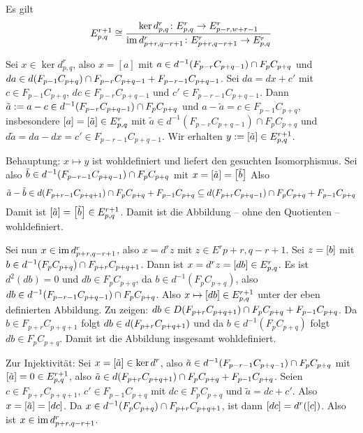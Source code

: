 \begin{lemma}
	Es gilt
	\[
		E^{r+1}_{p,q} \cong \frac{\ker d^r_{p,q} \colon E^r_{p,q} \to E^r_{p-r,w+r-1}}{\im d^r_{p+r,q-r+1} \colon E^r_{p+r,q-r+1} \to E^r_{p,q}} 
	\]
\end{lemma}
\begin{beweis}
	Sei $x \in \ker d^r_{p,q}$, also $x=[a]$ mit $a \in d^{-1} \enbrace*{F_{p-r} C_{p+q-1}} \cap F_p C_{p+q}$ und $d a \in d \enbrace*{F_{p-1} C_{p+q}}\cap F_{p-r}C_{p+q-1} + F_{p-r-1} C_{p+q-1}$.
	Sei $da = dx + c'$ mit $c \in F_{p-1}C_{p+q}$, $d c \in  F_{p-r} C_{p+q-1}$ und $c' \in F_{p-r-1} C_{p+q-1}$.
	Dann $\tilde{a} := a-c \in d^{-1} \enbrace*{F_{p-r} C_{p+q-1}} \cap F_p C_{p+q}$ und $a-\tilde{a}=c \in F_{p-1} C_{p+q}$, insbesondere $[a]=\benbrace*{\tilde{a}} \in E^r_{p,q}$ mit $\tilde{a} \in d^{-1}(F_{p-r} C_{p+q-1}) \cap F_p C_{p+q}$ und $d \tilde{a} = da - dx = c' \in F_{p-r-1} C_{p+q-1}$.
	Wir erhalten $y := \benbrace*{\tilde{a}} \in E^{r+1}_{p,q}$.

	Behauptung: $x \mapsto y$ ist wohldefiniert und liefert den gesuchten Isomorphismus.
	Sei also $\tilde{b} \in d^{-1}\enbrace*{F_{p-r-1}C_{p+q-1}}\cap F_pC_{p+q}$ mit $x=\benbrace*{\tilde{a}}=\benbrace*{\tilde{b}}$
	Also 
	\[
		\tilde{a}- \tilde{b} \in d \enbrace*{F_{p+r-1} C_{p+q+1}}\cap F_p C_{p+q} + F_{p-1} C_{p+q} \subseteq d \enbrace*{F_{p+r} C_{p+q-1}}\cap F_p C_{p+q} + F_{p-1} C_{p+q}
	\]
	Damit ist $\benbrace*{\tilde{a}} = \benbrace*{\tilde{b}} \in E^{r+1}_{p,q}$.
	Damit ist die Abbildung -- ohne den Quotienten -- wohldefiniert.
	
	Sei nun $x \in \im d^r_{p+r,q-r+1}$, also $x= d^r z$ mit $z \in E^r{p+r,q-r+1}$.
	Sei $z=\benbrace*{b}$ mit $b \in d^{-1} \enbrace*{F_p C_{p+q}} \cap F_{p+r} C_{p+q+1}$.
	Dann ist $x = d^r z = \benbrace*{d b} \in E^r_{p,q}$.
	Es ist $d^2(d b) =0$ und $d b \in F_p C_{p+q}$, da $b \in d^{-1}(F_p C_{p+q})$, also $db \in d^{-1} \enbrace*{F_{p-r-1} C_{p+q-1}} \cap F_p C_{p+q}$.
	Also $x \mapsto \benbrace*{db} \in E^{r+1}_{p,q}$ unter der eben definierten Abbildung.
	Zu zeigen: $db \in D \enbrace*{F_{p+r} C_{p+q+1}}\cap F_p C_{p+q} + F_{p-1} C_{p+q}$.
	Da $b \in F_{p+r} C_{p+q+1}$ folgt $db \in d \enbrace*{F_{p+r} C_{p+q+1}}$ und da $b \in d^{-1}(F_p C_{p+q})$ folgt $db \in F_p C_{p+q}$.
	Damit ist die Abbildung insgesamt wohldefiniert.
	
	Zur Injektivität: Sei $x= \benbrace*{\tilde{a}} \in \ker d^r$, also $\tilde{a} \in d^{-1} \enbrace*{F_{p-r-1} C_{p+q-1}} \cap F_p C_{p+q}$ mit $\benbrace*{\tilde{a}}=0 \in E^{r+1}_{p,q}$, also $\tilde{a} \in d \enbrace*{F_{p+r} C_{p+q+1}} \cap F_p C_{p+q} + F_{p-1} C_{p+q}$.
	Seien $c \in F_{p+r}C_{p+q+1}$, $c' \in F_{p-1}C_{p+q}$ mit $d c \in F_{p} C_{p+q}$ und $\tilde{a} = d c + c'$.
	Also $x= \benbrace*{\tilde{a}}= \benbrace*{d c}$.
	Da $x \in d^{-1} \enbrace*{F_p C_{p+q}} \cap F_{p+r} C_{p+q+1}$, ist dann $\benbrace*{d c}=d^r([c])$. 
	Also ist $x \in \im d^r_{p+r,q-r+1}$.
	

\end{beweis}
